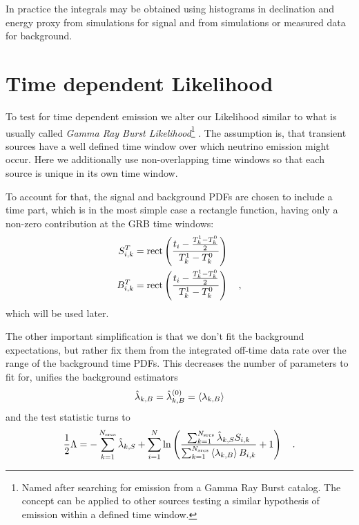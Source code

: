 In practice the integrals may be obtained using histograms in declination and energy proxy from simulations for signal and from simulations or measured data for background.



\section{Time dependent Likelihood}
To test for time dependent emission we alter our Likelihood similar to what is usually called \emph{Gamma Ray Burst Likelihood}\footnote{Named after searching for emission from a Gamma Ray Burst catalog. The concept can be applied to other sources testing a similar hypothesis of emission within a defined time window.} .
The assumption is, that transient sources have a well defined time window over which neutrino emission might occur.
Here we additionally use non-overlapping time windows so that each source is unique in its own time window.

To account for that, the signal and background PDFs are chosen to include a time part, which is in the most simple case a rectangle function, having only a non-zero contribution at the GRB time windows:
\begin{align}
  S_{i,k}^T &= \operatorname{rect}\left(\frac{t_i - \frac{T_k^1-T_k^0}{2}}
                              {T_k^1-T_k^0}\right) \\
  B_{i,k}^T &= \operatorname{rect}\left(\frac{t_i - \frac{T_k^1-T_k^0}{2}}
                              {T_k^1-T_k^0}\right)
  \quad\text{,}
\end{align}
which will be used later.

The other important simplification is that we don't fit the background expectations, but rather fix them from the integrated off-time data rate over the range of the background time PDFs.
This decreases the number of parameters to fit for, unifies the background estimators
\begin{equation}
  \hat{\lambda}_{k,B} = \hat{\lambda}_{k,B}^{(0)} = \Braket{\lambda_{k,B}}
\end{equation}
and the test statistic turns to
\begin{equation}
  \frac{1}{2}\Lambda
  = -\sum_{k=1}^{N_\text{srcs}}\hat{\lambda}_{k,S} +
    \sum_{i=1}^N \ln\left(
      \frac{\sum_{k=1}^{N_\text{srcs}}\hat{\lambda}_{k,S} S_{i,k}}
           {\sum_{k=1}^{N_\text{srcs}}\Braket{\lambda_{k,B}} B_{i,k}}
      + 1 \right)
  \quad\text{.}
\end{equation}

